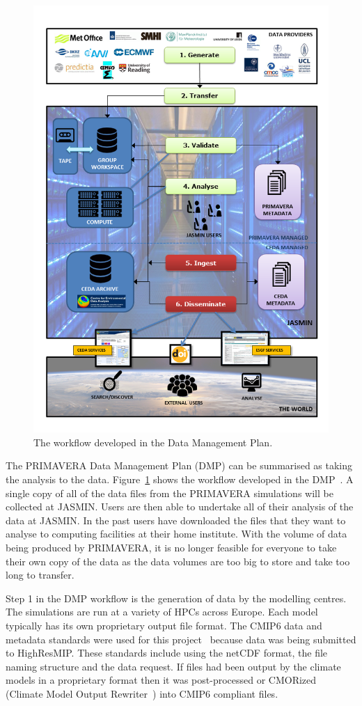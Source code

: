 \documentclass[gmd, manuscript]{copernicus}
\begin{document}
\begin{figure}[t]
\includegraphics[width=12cm]{fig01.png}
\caption{The workflow developed in the Data Management Plan.}
\label{dmp_workflow}
\end{figure}

The PRIMAVERA Data Management Plan (DMP) can be summarised as taking the analysis to the data. Figure~\ref{dmp_workflow} shows the workflow developed in the DMP~\citep{Mizielinski2016}. A single copy of all of the data files from the PRIMAVERA simulations will be collected at JASMIN. Users are then able to undertake all of their analysis of the data at JASMIN. In the past users have downloaded the files that they want to analyse to computing facilities at their home institute. With the volume of data being produced by PRIMAVERA, it is no longer feasible for everyone to take their own copy of the data as the data volumes are too big to store and take too long to transfer.

Step 1 in the DMP workflow is the generation of data  by the modelling centres. The simulations are run at a variety of HPCs across Europe. Each model typically has its own proprietary output file format. The CMIP6 data and metadata standards were used for this project~\citep{gmd-11-3659-2018} because data was being submitted to HighResMIP. These standards include using the netCDF format, the file naming structure and the data request. If files had been output by the climate models in a proprietary format then it was post-processed or CMORized (Climate Model Output Rewriter~\citep{Nadeau2019}) into CMIP6 compliant files.
\end{document}
